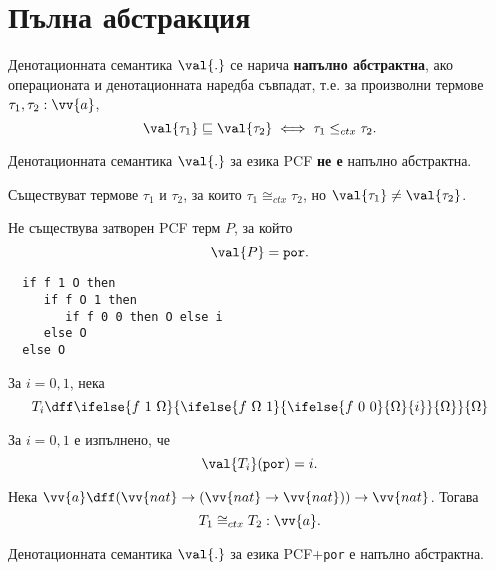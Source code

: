 \section{Пълна абстракция}

\begin{definition}
  Денотационната семантика $\val{.}$ се нарича {\bf напълно абстрактна}, ако
  операционата и денотационната наредба съвпадат, т.е.
  за произволни термове $\tau_1,\tau_2 : \vv{a}$,
  \[\val{\tau_1} \sqsubseteq \val{\tau_2} \iff \tau_1 \leq_{ctx} \tau_2.\]
\end{definition}

\begin{framed}
  \begin{theorem}
    Денотационната семантика $\val{.}$ за езика PCF {\bf не е} напълно абстрактна.
  \end{theorem}
\end{framed}

\begin{lemma}
  Съществуват термове $\tau_1$ и $\tau_2$,
  за които $\tau_1 \cong_{ctx} \tau_2$, но $\val{\tau_1} \neq \val{\tau_2}$.
\end{lemma}



\begin{proposition}
  Не съществува затворен PCF терм $P$, за който
  \[\val{P} = \texttt{por}.\]
\end{proposition}

\begin{verbatim}
  if f 1 O then 
     if f O 1 then
        if f 0 0 then O else i
     else O
  else O
\end{verbatim}

За $i = 0,1$, нека
\[T_i \dff \ifelse{f\ 1\ \Omega}{\ifelse{f\ \Omega\ 1}{\ifelse{f\ 0\ 0}{\Omega}{i}}{\Omega}}{\Omega}\]

\begin{proposition}
  За $i = 0,1$ е изпълнено, че
  \[\val{T_i}(\texttt{por}) = i.\]
\end{proposition}

\begin{proposition}
  Нека $\vv{a} \dff (\vv{nat}\to(\vv{nat}\to\vv{nat}))\to\vv{nat}$. Тогава
  \[T_1 \cong_{ctx} T_2 : \vv{a}.\]
\end{proposition}


\begin{framed}
  \begin{theorem}
    Денотационната семантика $\val{.}$ за езика PCF+\texttt{por} е напълно абстрактна.
  \end{theorem}
\end{framed}

